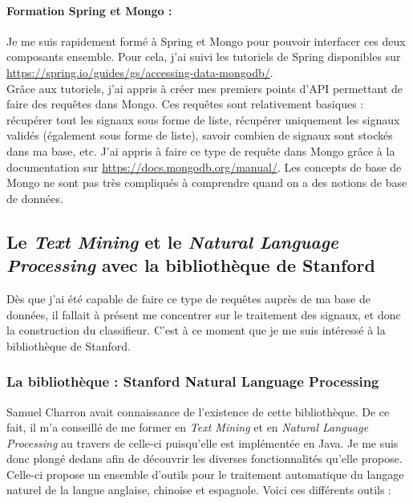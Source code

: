         \paragraph{Formation Spring et Mongo :}
            Je me suis rapidement formé à Spring et Mongo pour pouvoir interfacer ces deux composants ensemble. Pour cela, j'ai suivi les tutoriels de Spring disponibles sur \href{https://spring.io/guides/gs/accessing-data-mongodb/}{https://spring.io/guides/gs/accessing-data-mongodb/}.\\
            Grâce aux tutoriels, j'ai appris à créer mes premiers points d'API permettant de faire des requêtes dans Mongo. Ces requêtes sont relativement basiques : récupérer tout les signaux sous forme de liste, récupérer uniquement les signaux validés (également sous forme de liste), savoir combien de signaux sont stockés dans ma base, etc. J'ai appris à faire ce type de requête dans Mongo grâce à la documentation sur \href{https://docs.mongodb.org/manual/}{https://docs.mongodb.org/manual/}. Les concepts de base de Mongo ne sont pas très compliqués à comprendre quand on a des notions de base de données.\\

    \subsection{Le \textit{Text Mining} et le \textit{Natural Language Processing} avec la bibliothèque de Stanford}
        Dès que j'ai été capable de faire ce type de requêtes auprès de ma base de données, il fallait à présent me concentrer sur le traitement des signaux, et donc la construction du classifieur. C'est à ce moment que je me suis intéressé à la bibliothèque de Stanford.

        \subsubsection{La bibliothèque : Stanford Natural Language Processing}
            Samuel Charron avait connaissance de l'existence de cette bibliothèque. De ce fait, il m'a conseillé de me former en \textit{Text Mining} et en \textit{Natural Language Processing} au travers de celle-ci puisqu'elle est implémentée en Java. Je me suis donc plongé dedans afin de découvrir les diverses fonctionnalités qu'elle propose. Celle-ci propose un ensemble d'outils pour le traitement automatique du langage naturel de la langue anglaise, chinoise et espagnole. Voici ces différents outils :

